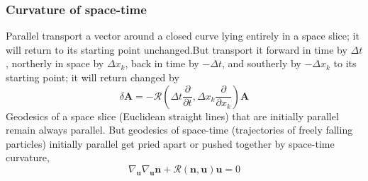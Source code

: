 \documentclass{article}
\begin{document}
\subsubsection*{Curvature of space-time}
Parallel transport a vector around a closed curve lying entirely in a space slice; it will return to its starting point unchanged.But transport it forward in time by $\Delta t$, northerly in space by $\Delta x_k$, back in time by $-\Delta t$, and southerly by $-\Delta x_k$ to its starting point; it will return changed by
\[\delta \mathbf{A} = -\mathcal{R}(\Delta t \frac{\partial}{\partial t},\Delta x_k \frac{\partial}{\partial x_k}) \mathbf{A}\]
Geodesics of a space slice (Euclidean straight lines) that are initially parallel remain always parallel. But geodesics of space-time (trajectories of freely falling particles) initially parallel get pried apart or pushed together by space-time curvature,
\[\nabla_{\mathbf{u}} \nabla_{\mathbf{u}} \mathbf{n} + \mathcal{R}(\mathbf{n},\mathbf{u})\mathbf{u} = 0\]
\end{document}

